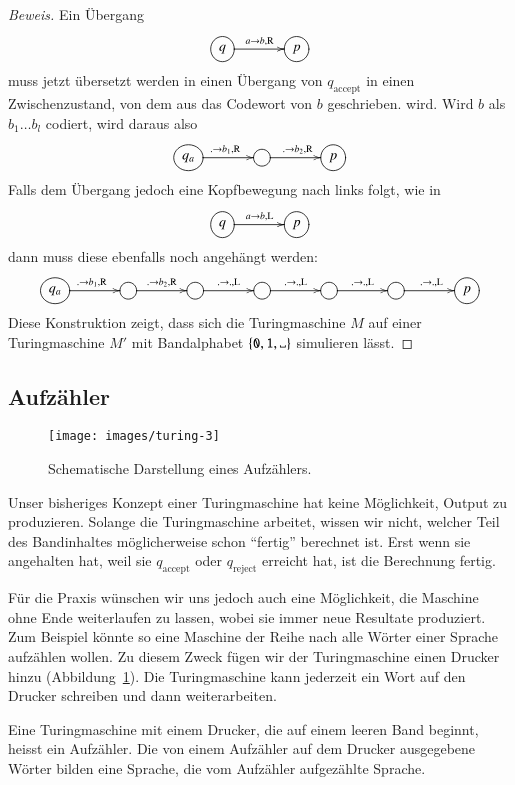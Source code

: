 \begin{proof}[Beweis]
Ein Übergang
\[
\entrymodifiers={++[o][F]}
\xymatrix@C+1pc{
q\ar[r]^{a\to b,\text{R}}
	&p
}
\]
muss jetzt übersetzt werden in einen Übergang von $q_\text{accept}$ in einen
Zwischenzustand, von dem aus das Codewort von $b$ geschrieben.
wird. Wird $b$ als $b_1\dots b_l$ codiert, wird daraus also
\[
\entrymodifiers={++[o][F]}
\xymatrix@C+1pc{
q_a\ar[r]^{.\to b_1,\text{R}}
	&\ar[r]^{.\to b_2,\text{R}}
		&p
}
\]
Falls dem Übergang jedoch eine Kopfbewegung nach links folgt, wie in
\[
\entrymodifiers={++[o][F]}
\xymatrix@C+1pc{
q\ar[r]^{a\to b,\text{L}}
	&p
}
\]
dann muss diese ebenfalls noch angehängt werden:
\[
\entrymodifiers={++[o][F]}
\xymatrix@C+1pc{
q_a\ar[r]^{.\to b_1,\text{R}}
	&\ar[r]^{.\to b_2,\text{R}}
		&\ar[r]^{.\to .,\text{L}}
			&\ar[r]^{.\to .,\text{L}}
				&\ar[r]^{.\to .,\text{L}}
					&\ar[r]^{.\to .,\text{L}}
						&p
}
\]
Diese Konstruktion zeigt, dass sich die Turingmaschine $M$ auf einer
Turingmaschine $M'$ mit Bandalphabet $\{\texttt{0},\texttt{1},\blank\}$ simulieren
lässt.
\end{proof}

\subsection{Aufzähler}
\begin{figure}
\begin{center}
\texttt{[image: images/turing-3]}
\end{center}
\caption{Schematische Darstellung eines Aufzählers.\label{turing-aufzaehler}}
\end{figure}
Unser bisheriges Konzept einer Turingmaschine hat keine Möglichkeit,
Output zu produzieren. Solange die Turingmaschine arbeitet, wissen wir
nicht, welcher Teil des Bandinhaltes möglicherweise schon ``fertig''
berechnet ist. Erst wenn sie angehalten hat, weil sie $q_{\text{accept}}$
oder $q_{\text{reject}}$ erreicht hat, ist die Berechnung fertig.

Für die Praxis wünschen wir uns jedoch auch eine Möglichkeit,
die Maschine ohne Ende weiterlaufen zu lassen, wobei sie immer neue
Resultate produziert. Zum Beispiel könnte so eine Maschine der Reihe
nach alle Wörter einer Sprache aufzählen wollen. Zu diesem Zweck
fügen wir der Turingmaschine einen Drucker hinzu
(Abbildung~\ref{turing-aufzaehler}). Die Turingmaschine
kann jederzeit ein Wort auf den Drucker schreiben und dann
weiterarbeiten.

\begin{definition}
%
Eine Turingmaschine mit einem Drucker, die auf einem leeren Band beginnt,
heisst ein Aufzähler. Die von einem Aufzähler auf dem Drucker ausgegebene
Wörter bilden eine Sprache, die vom Aufzähler aufgezählte Sprache.
\end{definition}

